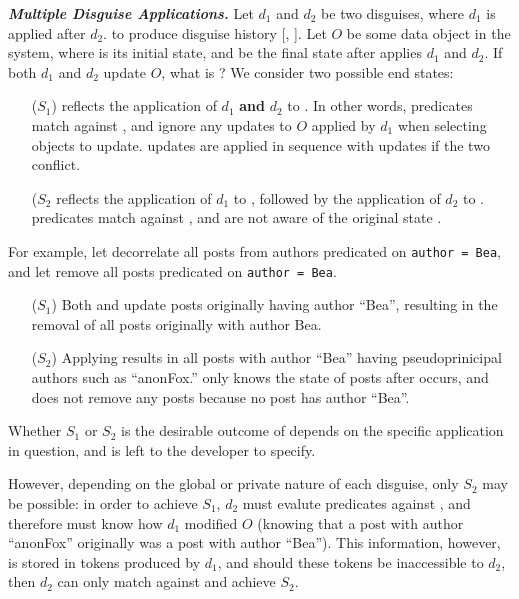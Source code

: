 \vspace{6pt}\noindent\textbf{\emph{Multiple Disguise Applications.}}
Let $d_1$ and $d_2$ be two disguises, where $d_1$ is applied after $d_2$.
to produce disguise history [, ]. 
%
Let $O$ be some data object in the system, where \ostart is its initial state, and
 be the final state after \sys applies $d_1$ and $d_2$.
%
If both $d_1$ and $d_2$ update $O$, what is ?
We consider two possible end states: 
%
\begin{enumerate}
\item[($S_1$)]  reflects the application of $d_1$ \textbf{and} $d_2$ to \ostart. In other
words,  predicates match against \ostart, and ignore any updates to $O$ applied by $d_1$
when selecting objects to update.  updates are applied in sequence with  updates if the two 
conflict.

\item[($S_2$]  reflects the application of $d_1$ to \ostart, followed by the application of $d_2$ to
\ohist{[\app{d_1}]}.  predicates match against \ohist{[\app{d_1}]}, and are not aware of the
original state \ostart.
\end{enumerate}

\noindent
For example, let  decorrelate all posts from authors predicated
on \texttt{author = Bea}, and let  remove all posts predicated on \texttt{author = Bea}.
%
\begin{enumerate}
\item[($S_1$)] Both  and  update posts originally having author ``Bea'', resulting in the
removal of all posts originally with author Bea.

\item[($S_2$)] Applying  results in all posts with author ``Bea'' having
pseudoprinicipal authors such as ``anonFox.''  only knows the state of posts after
 occurs, and does not remove any posts because no post has author ``Bea''.
\end{enumerate}

Whether $S_1$ or $S_2$ is the desirable outcome of  depends on the
specific application in question, and is left to the developer to specify. 

However, depending on the global or private nature of each disguise, only $S_2$ may be possible:
in order to achieve $S_1$, $d_2$ must evalute predicates against \ostart, and therefore must know how $d_1$ modified
$O$ (\eg knowing that a post with author ``anonFox'' originally was a post with author ``Bea''). 
This information, however, is stored in tokens produced by $d_1$, and should these tokens be
inaccessible to $d_2$, then $d_2$ can only match against \ohist{[\app{d_1}]} and achieve $S_2$.

